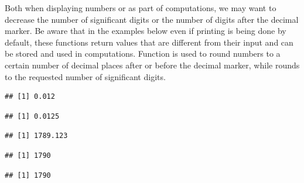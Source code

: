 \documentclass[krantz2]{krantz}\usepackage{knitr}%
\begin{document}
Both when displaying numbers or as part of computations, we may want to decrease the number of significant digits or the number of digits after the decimal marker. Be aware that in the examples below even if printing is being done by default, these functions return  values that are different from their input and can be stored and used in computations. Function  is used to round numbers to a certain number of decimal places after or before the decimal marker, while  rounds to the requested number of significant digits.

\begin{knitrout}\footnotesize
{}\color{fgcolor}\begin{kframe}
\begin{alltt}
\hlstd{(}\hlstd{,}  \hlstd{=} \hlstd{)}
\end{alltt}
\begin{verbatim}
## [1] 0.012
\end{verbatim}
\begin{alltt}
\hlstd{(}\hlstd{,}  \hlstd{=} \hlstd{)}
\end{alltt}
\begin{verbatim}
## [1] 0.0125
\end{verbatim}
\begin{alltt}
\hlstd{(}\hlstd{,}  \hlstd{=} \hlstd{)}
\end{alltt}
\begin{verbatim}
## [1] 1789.123
\end{verbatim}
\begin{alltt}
\hlstd{(}\hlstd{,}  \hlstd{=} \hlstd{)}
\end{alltt}
\begin{verbatim}
## [1] 1790
\end{verbatim}
\begin{alltt}
\hlstd{(}\hlstd{,}  \hlstd{=} \hlopt{-}\hlstd{)}
\end{alltt}
\begin{verbatim}
## [1] 1790
\end{verbatim}
\begin{alltt}
 \hlkwb{<-} 
 \hlkwb{<-}   \hlstd{=} \hlstd{)}

\end{alltt}
\end{kframe}
\end{knitrout}
\end{document}
